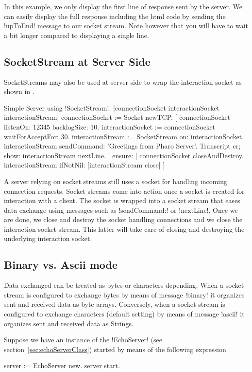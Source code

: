 \documentclass[a4paper,10pt,twoside]{book}
\begin{document}
In this example, we only display the first line of response sent by the server.
We can easily display the full response including the html code by sending the \ct!upToEnd! message to our socket stream.
Note however that you will have to wait a bit longer compared to displaying a single line.

\subsection{SocketStream at Server Side}
SocketStreams may also be used at server side to wrap the interaction socket as shown in .

\begin{script}{Simple Server using \ct!SocketStream!.}
|connectionSocket interactionSocket interactionStream|
connectionSocket := Socket newTCP. 
[
	connectionSocket listenOn: 12345 backlogSize: 10. 
	interactionSocket := connectionSocket waitForAcceptFor: 30. 
	interactionStream := SocketStream on: interactionSocket.
	interactionStream sendCommand: 'Greetings from Pharo Server'.
	Transcript cr; show: interactionStream nextLine.
] ensure: [
	connectionSocket closeAndDestroy.
	interactionStream ifNotNil: [interactionStream close]
]
\end{script}

A server relying on socket streams still uses a socket for handling incoming connection requests.
Socket streams come into action once a socket is created for interaction with a client.
The socket is wrapped into a socket stream that eases data exchange using messages such as \ct!sendCommand:! or \ct!nextLine!.
Once we are done, we close and destroy the socket handling connections and we close the interaction socket stream.
This latter will take care of closing and destroying the underlying interaction socket.

\subsection{Binary vs. Ascii mode}
Data exchanged can be treated as bytes or characters depending.
When a socket stream is configured to exchange bytes by means of message \ct!binary! it organizes sent and received data as byte arrays.
Conversely, when a socket stream is configured to exchange characters (default setting) by means of message \ct!ascii! it organizes sent and received data as Strings.

Suppose we have an instance of the \ct!EchoServer! (see section~\ref{sec:echoServerClass}) started by means of the following expression
\begin{code}{}
server := EchoServer new.
server start.
\end{code}
\end{document}

